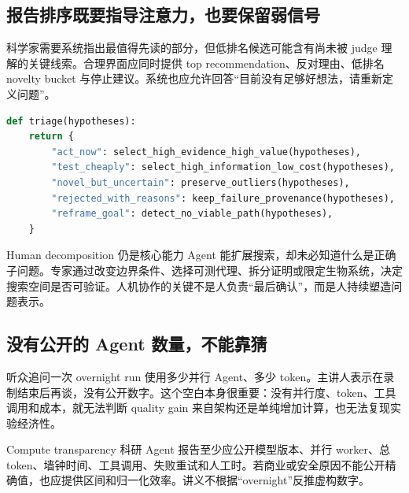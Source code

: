 \documentclass[a4paper]{article}
\begin{document}
\subsection{报告排序既要指导注意力，也要保留弱信号}

科学家需要系统指出最值得先读的部分，但低排名候选可能含有尚未被 judge 理解的关键线索。合理界面应同时提供 top recommendation、反对理由、低排名 novelty bucket 与停止建议。系统也应允许回答“目前没有足够好想法，请重新定义问题”。

\begin{lstlisting}[language=Python,caption={兼顾优先级与弱信号的报告分层}]
def triage(hypotheses):
    return {
        "act_now": select_high_evidence_high_value(hypotheses),
        "test_cheaply": select_high_information_low_cost(hypotheses),
        "novel_but_uncertain": preserve_outliers(hypotheses),
        "rejected_with_reasons": keep_failure_provenance(hypotheses),
        "reframe_goal": detect_no_viable_path(hypotheses),
    }
\end{lstlisting}


\begin{importantbox}{Human decomposition 仍是核心能力}
Agent 能扩展搜索，却未必知道什么是正确子问题。专家通过改变边界条件、选择可测代理、拆分证明或限定生物系统，决定搜索空间是否可验证。人机协作的关键不是人负责“最后确认”，而是人持续塑造问题表示。
\end{importantbox}

\subsection{没有公开的 Agent 数量，不能靠猜}

听众追问一次 overnight run 使用多少并行 Agent、多少 token。主讲人表示在录制结束后再谈，没有公开数字。这个空白本身很重要：没有并行度、token、工具调用和成本，就无法判断 quality gain 来自架构还是单纯增加计算，也无法复现实验经济性。

\begin{warningbox}{Compute transparency}
科研 Agent 报告至少应公开模型版本、并行 worker、总 token、墙钟时间、工具调用、失败重试和人工时。若商业或安全原因不能公开精确值，也应提供区间和归一化效率。讲义不根据“overnight”反推虚构数字。
\end{warningbox}

\end{document}
